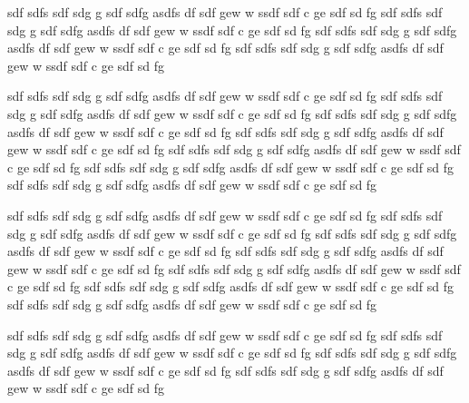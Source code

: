 \documentclass{article}
\begin{document}
sdf sdfs  sdf sdg g sdf sdfg asdfs df sdf gew w ssdf sdf c ge sdf sd fg
sdf sdfs  sdf sdg g sdf sdfg asdfs df sdf gew w ssdf sdf c ge sdf sd fg
sdf sdfs  sdf sdg g sdf sdfg asdfs df sdf gew w ssdf sdf c ge sdf sd fg
sdf sdfs  sdf sdg g sdf sdfg asdfs df sdf gew w ssdf sdf c ge sdf sd fg

sdf sdfs  sdf sdg g sdf sdfg asdfs df sdf gew w ssdf sdf c ge sdf sd fg
sdf sdfs  sdf sdg g sdf sdfg asdfs df sdf gew w ssdf sdf c ge sdf sd fg
sdf sdfs  sdf sdg g sdf sdfg asdfs df sdf gew w ssdf sdf c ge sdf sd fg
sdf sdfs  sdf sdg g sdf sdfg asdfs df sdf gew w ssdf sdf c ge sdf sd fg
sdf sdfs  sdf sdg g sdf sdfg asdfs df sdf gew w ssdf sdf c ge sdf sd fg
sdf sdfs  sdf sdg g sdf sdfg asdfs df sdf gew w ssdf sdf c ge sdf sd fg
sdf sdfs  sdf sdg g sdf sdfg asdfs df sdf gew w ssdf sdf c ge sdf sd fg

sdf sdfs  sdf sdg g sdf sdfg asdfs df sdf gew w ssdf sdf c ge sdf sd fg
sdf sdfs  sdf sdg g sdf sdfg asdfs df sdf gew w ssdf sdf c ge sdf sd fg
sdf sdfs  sdf sdg g sdf sdfg asdfs df sdf gew w ssdf sdf c ge sdf sd fg
sdf sdfs  sdf sdg g sdf sdfg asdfs df sdf gew w ssdf sdf c ge sdf sd fg
sdf sdfs  sdf sdg g sdf sdfg asdfs df sdf gew w ssdf sdf c ge sdf sd fg
sdf sdfs  sdf sdg g sdf sdfg asdfs df sdf gew w ssdf sdf c ge sdf sd fg
sdf sdfs  sdf sdg g sdf sdfg asdfs df sdf gew w ssdf sdf c ge sdf sd fg

sdf sdfs  sdf sdg g sdf sdfg asdfs df sdf gew w ssdf sdf c ge sdf sd fg
sdf sdfs  sdf sdg g sdf sdfg asdfs df sdf gew w ssdf sdf c ge sdf sd fg
sdf sdfs  sdf sdg g sdf sdfg asdfs df sdf gew w ssdf sdf c ge sdf sd fg
sdf sdfs  sdf sdg g sdf sdfg asdfs df sdf gew w ssdf sdf c ge sdf sd fg
\end{document}

